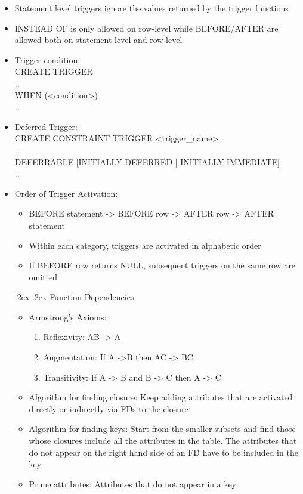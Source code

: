 \documentclass[10pt,landscape,a4paper]{scrartcl}
\makeatletter
\renewcommand{\section}{\@startsection{section}{1}{0mm}%
  {.2ex}%
  {.2ex}%
{\color{myblue}\sffamily\small\bfseries}}
\makeatother
\begin{document}
\begin{multicols*}{4}
\begin{itemize}
      \item Statement level triggers ignore the values returned by the trigger functions
      \item INSTEAD OF is only allowed on row-level while BEFORE/AFTER are allowed both on statement-level and row-level
      \item Trigger condition: \\
            CREATE TRIGGER \\
            ..  \\
            WHEN (<condition>) \\
            .. \\
      \item Deferred Trigger: \\
            CREATE CONSTRAINT TRIGGER <trigger\_name> \\
            .. \\
            DEFERRABLE [INITIALLY DEFERRED | INITIALLY IMMEDIATE] \\
            .. \\
      \item Order of Trigger Activation:
        \begin{itemize}
            \item BEFORE statement -> BEFORE row -> AFTER row -> AFTER statement
            \item Within each category, triggers are activated in alphabetic order
            \item If BEFORE row returns NULL, subsequent triggers on the same row are omitted
        \end{itemize}
       \section{Function Dependencies}
       \begin{itemize}
           \item Armstrong's Axioms:
           \begin{enumerate}
               \item Reflexivity: AB -> A
               \item Augmentation: If A ->B then AC -> BC
               \item Transitivity: If A -> B and B -> C then A -> C
           \end{enumerate}
           \item Algorithm for finding closure: Keep adding attributes that are activated directly or indirectly via FDs to the closure
           \item Algorithm for finding keys: Start from the smaller subsets and find those whose closures include all the attributes in the table. The attributes that do not appear on the right hand side of an FD have to be included in the key
           \item Prime attributes: Attributes that do not appear in a key
       \end{itemize}
  \end{itemize}

\end{multicols*}
\end{document}

